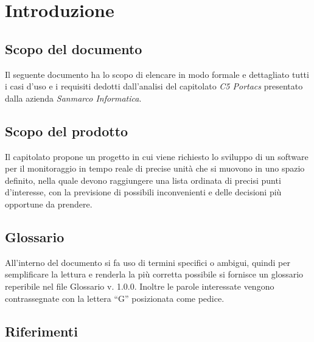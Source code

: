 \section{Introduzione}
\subsection{Scopo del documento}
Il seguente documento ha lo scopo di elencare in modo formale e dettagliato tutti i casi d’uso e i requisiti dedotti dall’analisi del capitolato \textit{C5 Portacs} presentato dalla azienda \textit{Sanmarco Informatica}.

\subsection{Scopo del prodotto}
Il capitolato propone un progetto in cui viene richiesto lo sviluppo di un software per il monitoraggio in tempo reale di precise unità che si muovono in uno spazio definito, nella quale devono raggiungere una lista ordinata di precisi punti d'interesse, con la previsione di possibili inconvenienti e delle decisioni più opportune da prendere.

\subsection{Glossario}
All’interno del documento si fa uso di termini specifici o ambigui, quindi per semplificare la lettura e renderla la più corretta possibile si fornisce un glossario reperibile nel file Glossario v. 1.0.0. Inoltre le parole interessate vengono contrassegnate con la lettera “G” posizionata come pedice.

\subsection{Riferimenti}
